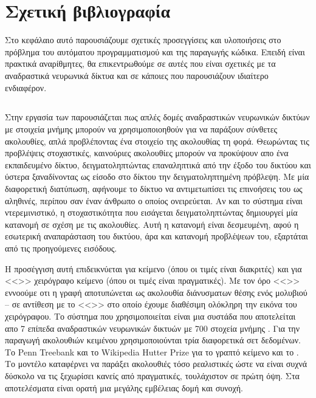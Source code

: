 \chapter{Σχετική βιβλιογραφία}

Στο κεφάλαιο αυτό παρουσιάζουμε σχετικές προσεγγίσεις και υλοποιήσεις στο πρόβλημα του αυτόματου προγραμματισμού και της παραγωγής κώδικα.
Επειδή είναι πρακτικά αναρίθμητες, θα επικεντρωθούμε σε αυτές που είναι σχετικές με τα αναδραστικά νευρωνικά δίκτυα και σε κάποιες που παρουσιάζουν ιδιαίτερο ενδιαφέρον.

\section{}
Στην εργασία των  παρουσιάζεται πως απλές δομές αναδραστικών νευρωνικών δικτύων με στοιχεία μνήμης  μπορούν να χρησιμοποιοηθούν για να παράξουν σύνθετες ακολουθίες, απλά προβλέποντας ένα στοιχείο της ακολουθίας τη φορά. 
Θεωρώντας τις προβλέψεις στοχαστικές, καινούριες ακολουθίες μπορούν να προκύψουν απο ένα εκπαιδευμένο δίκτυο, δειγματοληπτώντας επαναληπτικά από την έξοδο του δικτύου και ύστερα ξαναδίνοντας ως είσοδο στο δίκτου την δειγματοληπτημένη πρόβλεψη.
Με μία διαφορετική διατύπωση, αφήνουμε το δίκτυο να αντιμετωπίσει τις επινοήσεις του ως αληθινές, περίπου σαν έναν άνθρωπο ο οποίος ονειρεύεται. 
Αν και το σύστημα είναι ντερεμινιστικό, η στοχαστικότητα που εισάγεται δειγματοληπτώντας δημιουργεί μία κατανομή σε σχέση με τις ακολουθίες.
Αυτή η κατανομή είναι δεσμευμένη, αφού η εσωτερική αναπαράσταση του δικτύου, άρα και κατανομή προβλέψεων του, εξαρτάται από τις προηγούμενες εισόδους.

Η προσέγγιση αυτή επιδεικνύεται για κείμενο (όπου οι τιμές είναι διακριτές) και για <<>>  χειρόγραφο κείμενο (όπου οι τιμές είναι πραγματικές).
Με τον όρο <<>> εννοούμε οτι η γραφή αποτυπώνεται ως ακολουθία διάνυσματων θέσης ενός μολυβιού -- σε αντίθεση με το <<>> στο οποίο έχουμε διαθέσιμη ολόκληρη την εικόνα του χειρόγραφου.
Το σύστημα που χρησιμοποιείται είναι μια συστάδα που αποτελείται απο 7 επίπεδα αναδραστικών νευρωνικών δικτυών με 700 στοχεία μνήμης .
Για την παραγωγή ακολουθιών κειμένου χρησιμοποιούνται τρία διαφορετικά σετ δεδομένων. Το Penn Treebank και το Wikipedia Hutter Prize για το γραπτό κείμενο και το .
Το μοντέλο καταφέρνει να παράξει ακολουθιές τόσο ρεαλιστικές ώστε να είναι συχνά δύσκολο να τις ξεχωρίσει κανείς από πραγματικές, τουλάχιστον σε πρώτη όψη.
Στα αποτελέσματα είναι ορατή μια μεγάλης εμβέλειας δομή και συνοχή.

